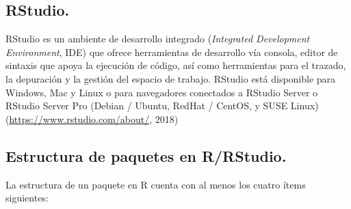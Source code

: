 \subsection{RStudio.}

RStudio es un ambiente de desarrollo integrado (\textit{Integrated Development Environment}, IDE) que ofrece herramientas de desarrollo vía consola, editor de sintaxis que apoya la ejecución de código, así como herramientas para el trazado, la depuración y la gestión del espacio de trabajo.  RStudio está disponible para Windows, Mac y Linux o para navegadores conectados a RStudio Server o RStudio Server Pro (Debian / Ubuntu, RedHat / CentOS, y SUSE Linux) (\url{https://www.rstudio.com/about/}, 2018)
 

\subsection{Estructura de paquetes en R/RStudio.}

La estructura de un paquete en R cuenta con al menos los cuatro \'items siguientes:

